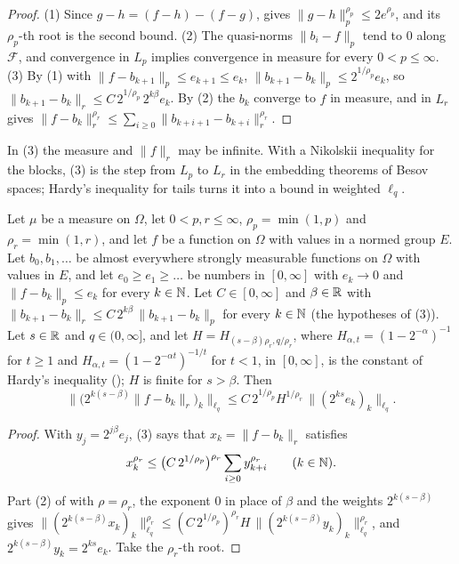 \begin{proof}
\leanok
{}
(1) Since $g - h = (f - h) - (f - g)$,  gives
$\|g - h\|_p^{\rho_p} \leq 2 e^{\rho_p}$, and its $\rho_p$-th root is the second bound. (2) The
quasi-norms $\|b_i - f\|_p$ tend to $0$ along $\mathcal{F}$, and convergence in $L_p$ implies
convergence in measure for every $0 < p \leq \infty$. (3) By (1)
with $\|f - b_{k+1}\|_p \leq e_{k+1} \leq e_k$, $\|b_{k+1} - b_k\|_p \leq 2^{1/\rho_p} e_k$, so
$\|b_{k+1} - b_k\|_r \leq C \, 2^{1/\rho_p} \, 2^{k\beta} e_k$. By (2) the $b_k$ converge to $f$
in measure, and  in $L_r$ gives
$\|f - b_k\|_r^{\rho_r} \leq \sum_{i \geq 0} \|b_{k+i+1} - b_{k+i}\|_r^{\rho_r}$.
\end{proof}

In (3) the measure and $\|f\|_r$ may be infinite. With a Nikolskii inequality for the blocks,
(3) is the step from $L_p$ to $L_r$ in the embedding theorems of Besov spaces; Hardy's
inequality for tails turns it into a bound in weighted $\ell_q$.

\begin{lemma}
\label{lem:near-best-lq}
\leanok
{}
Let $\mu$ be a measure on $\Omega$, let $0 < p, r \leq \infty$, $\rho_p = \min(1, p)$ and
$\rho_r = \min(1, r)$, and let $f$ be a function on $\Omega$ with values in a normed group $E$.
Let $b_0, b_1, \dots$ be almost everywhere strongly measurable functions on $\Omega$ with values
in $E$, and let $e_0 \geq e_1 \geq \dots$ be numbers in $[0, \infty]$ with $e_k \to 0$ and
$\|f - b_k\|_p \leq e_k$ for every $k \in \mathbb{N}$. Let $C \in [0, \infty]$ and $\beta \in \mathbb{R}$ with
$\|b_{k+1} - b_k\|_r \leq C \, 2^{k\beta} \, \|b_{k+1} - b_k\|_p$ for every $k \in \mathbb{N}$ (the
hypotheses of (3)). Let $s \in \mathbb{R}$ and $q \in (0, \infty]$, and let
$H = H_{(s - \beta)\rho_r, q/\rho_r}$, where $H_{\alpha, t} = (1 - 2^{-\alpha})^{-1}$ for
$t \geq 1$ and $H_{\alpha, t} = (1 - 2^{-\alpha t})^{-1/t}$ for $t < 1$, in $[0, \infty]$, is the
constant of Hardy's inequality (); $H$ is finite for $s > \beta$.
Then
\[
  \bigl\| \bigl(2^{k(s-\beta)} \|f - b_k\|_r\bigr)_k \bigr\|_{\ell_q}
  \leq C \, 2^{1/\rho_p} H^{1/\rho_r} \, \bigl\| (2^{ks} e_k)_k \bigr\|_{\ell_q} .
\]
\end{lemma}

\begin{proof}
\leanok
{}
With $y_j = 2^{j\beta} e_j$, (3) says that $x_k = \|f - b_k\|_r$
satisfies
\[
  x_k^{\rho_r} \leq \bigl(C \, 2^{1/\rho_p}\bigr)^{\rho_r} \sum_{i \geq 0} y_{k+i}^{\rho_r}
  \qquad (k \in \mathbb{N}) .
\]
Part (2) of  with $\rho = \rho_r$, the exponent $0$ in place of $\beta$
and the weights $2^{k(s - \beta)}$ gives
$\|(2^{k(s-\beta)} x_k)_k\|_{\ell_q}^{\rho_r} \leq (C \, 2^{1/\rho_p})^{\rho_r} H \,
\|(2^{k(s-\beta)} y_k)_k\|_{\ell_q}^{\rho_r}$, and $2^{k(s-\beta)} y_k = 2^{ks} e_k$. Take the
$\rho_r$-th root.
\end{proof}

